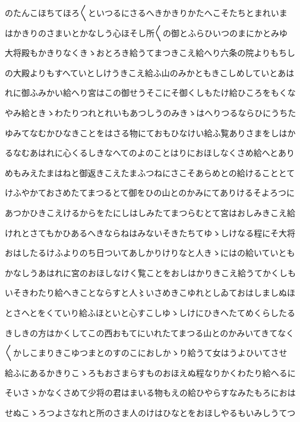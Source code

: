 \documentclass[a4paper,11pt,landscape]{ltjtarticle}
\begin{document}
\par\medskip
のたんこほちてほろ〱といつるにさるへきかきりかたへこそたちとまれいま
\par\medskip
はかきりのさまいとかなしう心ほそし所〱の御とふらひいつのまにかとみゆ
\par\medskip
大将殿もかきりなくきゝおとろき給うてまつきこえ給へり六条の院よりもちし
\par\medskip
の大殿よりもすへていとしけうきこえ給ふ山のみかともきこしめしていとあは
\par\medskip
れに御ふみかい給へり宮はこの御せうそこにそ御くしもたけ給ひころをもくな
\par\medskip
やみ給ときゝわたりつれとれいもあつしうのみきゝはへりつるならひにうちた
\par\medskip
ゆみてなむかひなきことをはさる物にておもひなけい給ふ覧ありさまをしはか
\par\medskip
るなむあはれに心くるしきなへてのよのことはりにおほしなくさめ給へとあり
\par\medskip
めもみえたまはねと御返きこえたまふつねにさこそあらめとの給けることとて
\par\medskip
けふやかておさめたてまつるとて御をひの山とのかみにてありけるそよろつに
\par\medskip
あつかひきこえけるからをたにしはしみたてまつらむとて宮はおしみきこえ給
\par\medskip
けれとさてもかひあるへきならねはみないそきたちてゆゝしけなる程にそ大将
\par\medskip
おはしたるけふよりのち日ついてあしかりけりなと人きゝにはの給いていとも
\par\medskip
かなしうあはれに宮のおほしなけく覧ことをおしはかりきこえ給うてかくしも
\par\medskip
いそきわたり給へきことならすと人〻いさめきこゆれとしゐておはしましぬほ
\par\medskip
とさへとをくていり給ふほといと心すこしゆゝしけにひきへたてめくらしたる
\par\medskip
きしきの方はかくしてこの西おもてにいれたてまつる山とのかみいてきてなく
\par\medskip
〱かしこまりきこゆつまとのすのこにおしかゝり給うて女はうよひいてさせ
\par\medskip
給ふにあるかきりこゝろもおさまらすものおほえぬ程なりかくわたり給へるに
\par\medskip
そいさゝかなくさめて少将の君はまいる物もえの給ひやらすなみたもろにおは
\par\medskip
せぬこゝろつよさなれと所のさま人のけはひなとをおほしやるもいみしうてつ
\par\medskip
\end{document}
